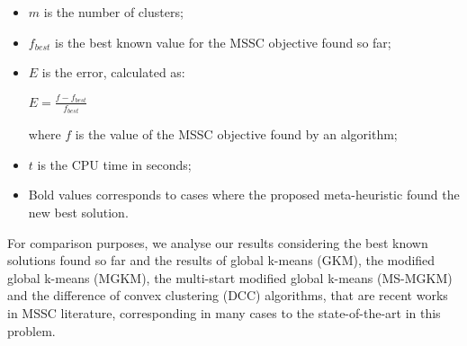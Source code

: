\begin{itemize}

	\item $m$ is the number of clusters;

	\item $f_{best}$ is the best known value for the MSSC objective found so far;

	\item $E$ is the error, calculated as:

		\begin{center}
		\Large
			$E = \frac{f - f_{best}}{f_{best}}$
		\end{center}
		
	where $f$ is the value of the MSSC objective found by an algorithm;
	
	\item $t$ is the CPU time in seconds;

	\item Bold values corresponds to cases where the proposed meta-heuristic found the new best solution.

\end{itemize}

For comparison purposes, we analyse our results considering the best known solutions found so far and the results of global k-means (GKM), the modified global k-means (MGKM), the multi-start modified global k-means (MS-MGKM) and the difference of convex clustering (DCC) algorithms, that are recent works in MSSC literature, corresponding in many cases to the state-of-the-art in this problem.
